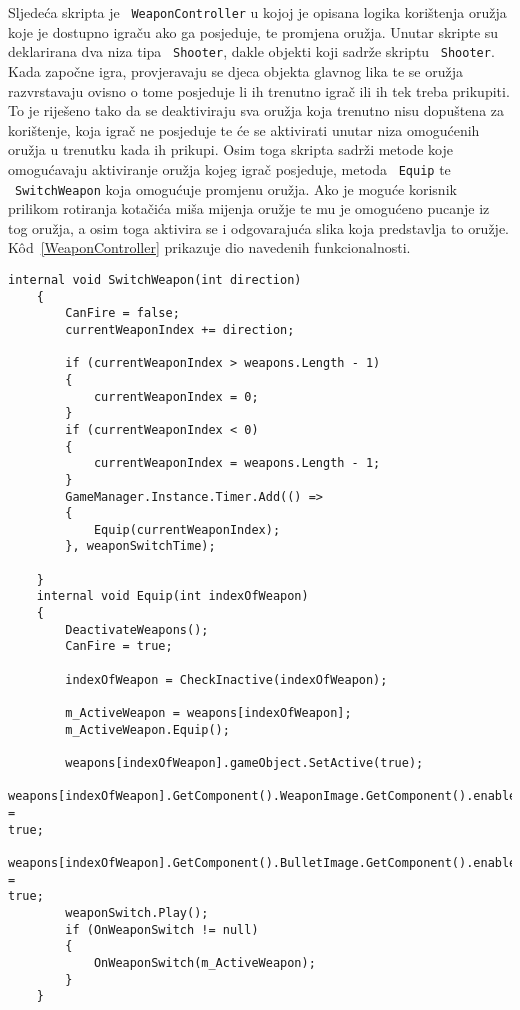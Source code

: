 Sljedeća skripta je ~\texttt{WeaponController} u kojoj je opisana logika korištenja oružja
koje je dostupno igraču ako ga posjeduje, te promjena oružja. Unutar skripte su
deklarirana dva niza tipa ~\texttt{Shooter}, dakle objekti koji sadrže skriptu ~\texttt{Shooter}. Kada
započne igra, provjeravaju se djeca objekta glavnog lika te se oružja razvrstavaju
ovisno o tome posjeduje li ih trenutno igrač ili ih tek treba prikupiti. To je
riješeno tako da se deaktiviraju sva oružja koja trenutno nisu dopuštena za
korištenje, koja igrač ne posjeduje te će se aktivirati unutar niza omogućenih
oružja u trenutku kada ih prikupi. Osim toga skripta sadrži metode koje omogućavaju
aktiviranje oružja kojeg igrač posjeduje, metoda ~\texttt{Equip} te ~\texttt{SwitchWeapon} koja
omogućuje promjenu oružja. Ako je moguće korisnik prilikom rotiranja kotačića miša
mijenja oružje te mu je omogućeno pucanje iz tog oružja, a osim toga aktivira se i
odgovarajuća slika koja predstavlja to oružje. K\^od~\ref{WeaponController}
prikazuje dio navedenih funkcionalnosti.
\begin{lstlisting}[caption={Kontroler oružja}, label=WeaponController]
    internal void SwitchWeapon(int direction)
    {
        CanFire = false;
        currentWeaponIndex += direction;

        if (currentWeaponIndex > weapons.Length - 1)
        {
            currentWeaponIndex = 0;
        }
        if (currentWeaponIndex < 0)
        {
            currentWeaponIndex = weapons.Length - 1;
        }
        GameManager.Instance.Timer.Add(() =>
        {
            Equip(currentWeaponIndex);
        }, weaponSwitchTime);

    }
    internal void Equip(int indexOfWeapon)
    {
        DeactivateWeapons();
        CanFire = true;

        indexOfWeapon = CheckInactive(indexOfWeapon);
        
        m_ActiveWeapon = weapons[indexOfWeapon];
        m_ActiveWeapon.Equip();

        weapons[indexOfWeapon].gameObject.SetActive(true);
        weapons[indexOfWeapon].GetComponent().WeaponImage.GetComponent().enabled =
true;
        weapons[indexOfWeapon].GetComponent().BulletImage.GetComponent().enabled =
true;
        weaponSwitch.Play();
        if (OnWeaponSwitch != null)
        {
            OnWeaponSwitch(m_ActiveWeapon);
        }
    }
\end{lstlisting}


